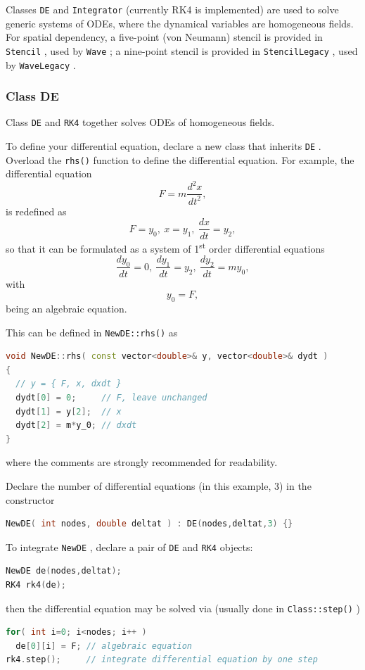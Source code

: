 \documentclass[12pt,a4paper]{article}
\newcommand{\type}[1]{{\small\small\tt #1} }
\begin{document}
Classes \type{DE} and \type{Integrator} (currently RK4 is implemented) are used to solve generic systems of ODEs, where the dynamical variables are homogeneous fields. For spatial dependency, a five-point (von Neumann) stencil is provided in \type{Stencil}, used by \type{Wave}; a nine-point stencil is provided in \type{StencilLegacy}, used by \type{WaveLegacy}.

\subsubsection{Class DE}
\label{sec:de}

Class \type{DE} and \type{RK4} together solves ODEs of homogeneous fields.

To define your differential equation, declare a new class that inherits \type{DE}. Overload the \type{rhs()} function to define the differential equation. For example, the differential equation
\[
    F = m\frac{d^2x}{dt^2},
\]
is redefined as
\[
F = y_0,~x = y_1,~\frac{dx}{dt} = y_2,
\]
so that it can be formulated as a system of 1\textsuperscript{st} order differential equations
\[
    \frac{dy_0}{dt} = 0,~
    \frac{dy_1}{dt} = y_2,~
    \frac{dy_2}{dt} = my_0,
\]
with
\[
    y_0 = F,
\]
being an algebraic equation.

This can be defined in \type{NewDE::rhs()} as
\begin{lstlisting}[language=C++]
void NewDE::rhs( const vector<double>& y, vector<double>& dydt )
{
  // y = { F, x, dxdt }
  dydt[0] = 0;     // F, leave unchanged
  dydt[1] = y[2];  // x
  dydt[2] = m*y_0; // dxdt
}
\end{lstlisting}
where the comments are strongly recommended for readability.

Declare the number of differential equations (in this example, 3) in the constructor
\begin{lstlisting}[language=C++]
NewDE( int nodes, double deltat ) : DE(nodes,deltat,3) {}
\end{lstlisting}

To integrate \type{NewDE}, declare a pair of \type{DE} and \type{RK4} objects:
\begin{lstlisting}[language=C++]
NewDE de(nodes,deltat);
RK4 rk4(de);
\end{lstlisting}
then the differential equation may be solved via (usually done in \type{Class::step()})
\begin{lstlisting}[language=C++]
for( int i=0; i<nodes; i++ )
  de[0][i] = F; // algebraic equation
rk4.step();     // integrate differential equation by one step
\end{lstlisting}
\end{document}
